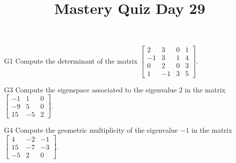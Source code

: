 \documentclass{sbgLAquiz}
\title{Mastery Quiz Day 29 }
\begin{document}
\begin{problem}{G1}
Compute the determinant of the matrix $\begin{bmatrix} 2 & 3 & 0 & 1 \\ -1 & 3 & 1 & 4 \\ 0 & 2 & 0 & 3 \\ 1 & -1 & 3 & 5 \end{bmatrix}$.
\end{problem}

\begin{problem}{G3}
Compute the eigenspace associated to the eigenvalue $2$ in the matrix $\begin{bmatrix} -1 & 1 & 0 \\ -9 & 5 & 0 \\ 15 & -5 & 2 \end{bmatrix}$.
\end{problem}
\newpage

\begin{problem}{G4}
Compute the geometric multiplicity of the eigenvalue $-1$ in the matrix $\begin{bmatrix} 4 & -2 & -1 \\ 15 & -7 & -3 \\ -5 & 2 & 0 \end{bmatrix}$.  
\end{problem}
\end{document}
